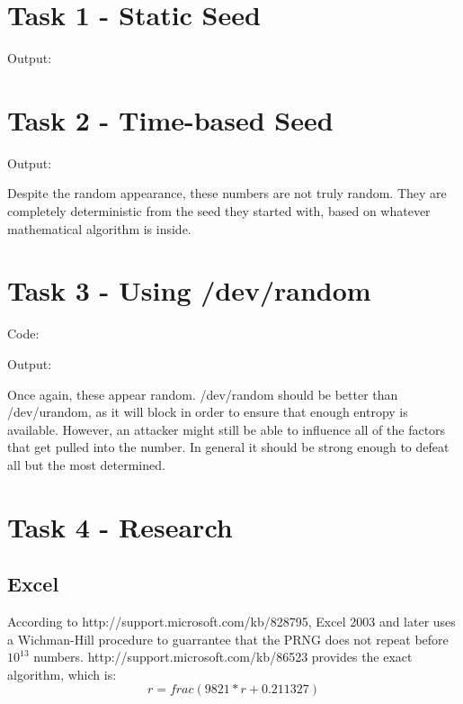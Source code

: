 \documentclass{article}
\begin{document}
\pagestyle{fancy}

\section{Task 1 - Static Seed}
\par Output:


\section{Task 2 - Time-based Seed}
\par Output:


\par Despite the random appearance, these numbers are not truly random. They are completely deterministic from the seed they started with, based on whatever mathematical algorithm is inside. 

\section{Task 3 - Using /dev/random}
\par Code:
\lstset{language=C}


\par Output:


\par Once again, these appear random. /dev/random should be better than /dev/urandom, as it will block in order to ensure that enough entropy is available. However, an attacker might still be able to influence all of the factors that get pulled into the number. In general it should be strong enough to defeat all but the most determined.

\section{Task 4 - Research}
\subsection{Excel}
\par According to http://support.microsoft.com/kb/828795, Excel 2003 and later uses a Wichman-Hill procedure to guarrantee that the PRNG does not repeat before $10^{13}$ numbers. http://support.microsoft.com/kb/86523 provides the exact algorithm, which is:
$$r=frac(9821 * r + 0.211327)$$
\end{document}
